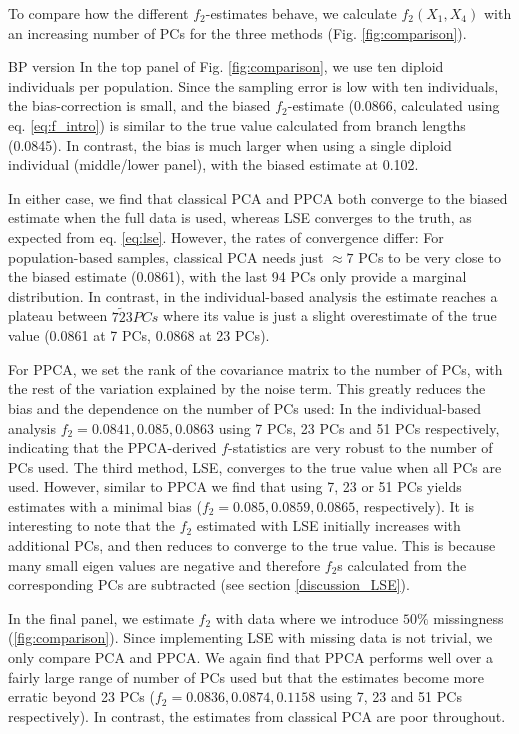 \documentclass[12pt, letterpaper]{article}
\begin{document}
To compare how the different $f_2$-estimates behave, we calculate $f_2(X_1, X_4)$  with an increasing number of PCs for the three methods (Fig. \ref{fig:comparison}).  

BP version
In the top panel of Fig. \ref{fig:comparison}, we use ten diploid individuals per population. Since the sampling error is low with ten individuals, the bias-correction is small, and the biased $f_2$-estimate (0.0866, calculated using eq. \ref{eq:f_intro}) is similar to the true value calculated from branch lengths (0.0845). In contrast, the bias is much larger when using a single diploid individual (middle/lower panel), with the biased estimate at 0.102. 

In either case, we find that classical PCA and PPCA both converge to the biased estimate when the full data is used, whereas LSE converges to the truth, as expected from eq. \ref{eq:lse}. However, the rates of convergence differ: For population-based samples, classical PCA needs just $\approx 7$ PCs to be very close to the biased estimate (0.0861), with the last 94 PCs only provide a marginal distribution. In contrast, in the individual-based analysis the estimate reaches a plateau between $7 \tilde 23 PCs$ where its value is just a slight overestimate of the true value (0.0861 at 7 PCs, 0.0868 at 23 PCs).

For PPCA, we set the rank of the covariance matrix to the number of PCs, with the rest of the variation explained by the noise term. This greatly reduces the bias and the dependence on the number of PCs used: In the individual-based analysis $f_2 = 0.0841, 0.085, 0.0863$ using 7 PCs, 23 PCs and 51 PCs respectively, indicating that the PPCA-derived $f$-statistics are very robust to the number of PCs used. The third method, LSE, converges to the true value when all PCs are used. However, similar to PPCA we find that using 7, 23 or 51 PCs yields estimates with a minimal bias ($f_2 = 0.085, 0.0859, 0.0865$, respectively). It is interesting to note that the $f_2$ estimated with LSE initially increases with additional PCs, and then reduces to converge to the true value. This is because many small eigen values are negative and therefore $f_2$s calculated from the corresponding PCs are subtracted (see section \ref{discussion_LSE}).

In the final panel, we estimate $f_2$ with data where we introduce $50\%$ missingness (\ref{fig:comparison}). Since implementing LSE with missing data is not trivial, we only compare PCA and PPCA. We again find that PPCA performs well over a fairly large range of number of PCs used but that the estimates become more erratic beyond 23 PCs ($f_2 = 0.0836, 0.0874, 0.1158$ using 7, 23 and 51 PCs respectively). In contrast, the estimates from classical PCA are poor throughout.
\end{document}
